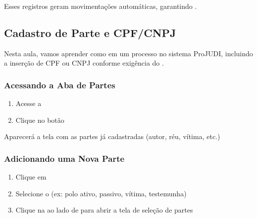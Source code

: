 \documentclass[letterpaper,10pt,brazil]{sphinxmanual}
\begin{document}
\sphinxAtStartPar
Esses registros geram movimentações automáticas, garantindo .

\sphinxstepscope


\subsection{Cadastro de Parte e CPF/CNPJ}
\label{\detokenize{projud_23_cadastroparte:cadastro-de-parte-e-cpf-cnpj}}\label{\detokenize{projud_23_cadastroparte::doc}}
\sphinxAtStartPar
Nesta aula, vamos aprender como  em um processo no sistema ProJUDI, incluindo a inserção de CPF ou CNPJ conforme exigência do .


\subsubsection{Acessando a Aba de Partes}
\label{\detokenize{projud_23_cadastroparte:acessando-a-aba-de-partes}}\begin{enumerate}
%
\item {} 
\sphinxAtStartPar
Acesse a 

\item {} 
\sphinxAtStartPar
Clique no botão 

\end{enumerate}

\sphinxAtStartPar
Aparecerá a tela com as partes já cadastradas (autor, réu, vítima, etc.)


\subsubsection{Adicionando uma Nova Parte}
\label{\detokenize{projud_23_cadastroparte:adicionando-uma-nova-parte}}\begin{enumerate}
%
\item {} 
\sphinxAtStartPar
Clique em 

\item {} 
\sphinxAtStartPar
Selecione o  (ex: polo ativo, passivo, vítima, testemunha)

\item {} 
\sphinxAtStartPar
Clique na  ao lado de  para abrir a tela de seleção de partes

\end{enumerate}
\end{document}
